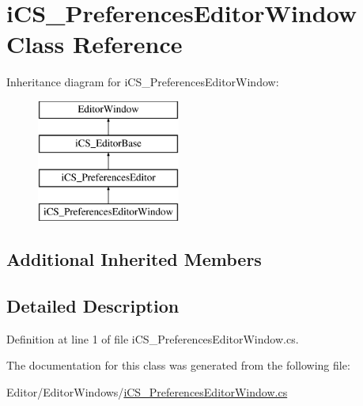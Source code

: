 \hypertarget{classi_c_s___preferences_editor_window}{\section{i\+C\+S\+\_\+\+Preferences\+Editor\+Window Class Reference}
\label{classi_c_s___preferences_editor_window}
}
Inheritance diagram for i\+C\+S\+\_\+\+Preferences\+Editor\+Window\+:\begin{figure}[H]
\begin{center}
\leavevmode
\includegraphics[height=4.000000cm]{classi_c_s___preferences_editor_window}
\end{center}
\end{figure}
\subsection*{Additional Inherited Members}


\subsection{Detailed Description}


Definition at line 1 of file i\+C\+S\+\_\+\+Preferences\+Editor\+Window.\+cs.



The documentation for this class was generated from the following file\+:\begin{DoxyCompactItemize}
\item 
Editor/\+Editor\+Windows/\hyperlink{i_c_s___preferences_editor_window_8cs}{i\+C\+S\+\_\+\+Preferences\+Editor\+Window.\+cs}\end{DoxyCompactItemize}
